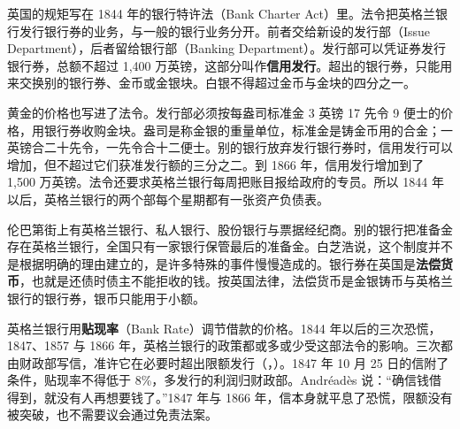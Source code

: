 英国的规矩写在 1844 年的银行特许法（Bank Charter Act）里。法令把英格兰银行发行银行券的业务，与一般的银行业务分开\cite{act1844}。前者交给新设的发行部（Issue Department），后者留给银行部（Banking Department）\cite{act1844}。发行部可以凭证券发行银行券，总额不超过 1,400 万英镑，这部分叫作\textbf{信用发行}\cite{act1844}。超出的银行券，只能用来交换别的银行券、金币或金银块\cite{act1844}。白银不得超过金币与金块的四分之一\cite{act1844}。

黄金的价格也写进了法令。发行部必须按每盎司标准金 3 英镑 17 先令 9 便士的价格，用银行券收购金块\cite{act1844}。盎司是称金银的重量单位，标准金是铸金币用的合金；一英镑合二十先令，一先令合十二便士。别的银行放弃发行银行券时，信用发行可以增加，但不超过它们获准发行额的三分之二\cite{act1844}。到 1866 年，信用发行增加到了 1,500 万英镑\cite{boe2017}。法令还要求英格兰银行每周把账目报给政府的专员\cite{act1844}。所以 1844 年以后，英格兰银行的两个部每个星期都有一张资产负债表\cite{boe2017}。

伦巴第街上有英格兰银行、私人银行、股份银行与票据经纪商\cite{bagehot1873}。别的银行把准备金存在英格兰银行，全国只有一家银行保管最后的准备金。白芝浩说，这个制度并不是根据明确的理由建立的，是许多特殊的事件慢慢造成的\cite{bagehot1873}。银行券在英国是\textbf{法偿货币}，也就是还债时债主不能拒收的钱。按英国法律，法偿货币是金银铸币与英格兰银行的银行券，银币只能用于小额\cite{bagehot1873}。

英格兰银行用\textbf{贴现率}（Bank Rate）调节借款的价格。1844 年以后的三次恐慌，1847、1857 与 1866 年，英格兰银行的政策都或多或少受这部法令的影响\cite{bagehot1873}。三次都由财政部写信，准许它在必要时超出限额发行（，）。1847 年 10 月 25 日的信附了条件，贴现率不得低于 8\%，多发行的利润归财政部\cite{andreades1909}。Andréadès 说：“确信钱借得到，就没有人再想要钱了。”\cite{andreades1909}1847 年与 1866 年，信本身就平息了恐慌，限额没有被突破，也不需要议会通过免责法案\cite{andreades1909}。


